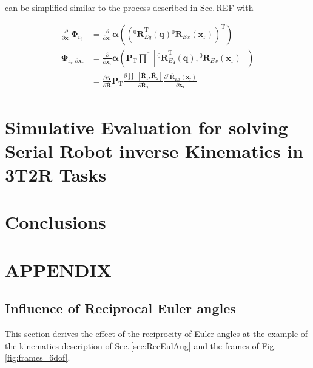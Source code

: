 \documentclass[twocolumn,10pt]{IFTOMM}
\newcommand{\bm}[1]{\boldsymbol{#1}}
\newcommand{\rotmat}[2]{{{ }^{#1}\boldsymbol{R}}_{#2}}
\newcommand{\rotmato}[2]{{{ }^{#1}\boldsymbol{\overline{R}}}_{#2}}
\newcommand{\transp}[0]{{\mathrm{T}}}
\begin{document}
can be simplified similar to the process described in Sec.\,REF with

\begin{align}
\frac{\partial}{\partial \bm{x}_{\mathrm{r}}}\bm{\Phi}_{\mathrm{r}_i}
&=
\frac{\partial}{\partial \bm{x}_{\mathrm{r}}} \bm{\alpha}\left((\rotmat{0}{Eq}^\transp(\bm{q}) \rotmat{0}{Ex}(\bm{x}_{\mathrm{r}}))^\transp\right) \label{equ:grad_Phi_x} \\
\bm{\Phi}_{\mathrm{r}_i,\partial \bm{x}_{\mathrm{r}}} 
&=
\frac{\partial}{\partial \bm{x}_{\mathrm{r}}} \overline{\bm{\alpha}}\left(
\bm{P}_{\mathrm{T}}
\overline{\prod}\left[ \rotmato{0}{Eq}^\transp(\bm{q}), \rotmato{0}{Ex}(\bm{x}_{\mathrm{r}})\right]\right) \nonumber \\
&=
\frac{\partial \overline{\bm{\alpha}}}{\partial \overline{\bm{R}}}
\bm{P}_{\mathrm{T}}
\frac{\partial \overline{\prod}\left[ \overline{\bm{R}}_1, \overline{\bm{R}}_2\right]}{\partial \overline{\bm{R}}_2}
\frac{\partial \rotmato{0}{Ex}(\bm{x}_{\mathrm{r}})}{\partial \bm{x}_{\mathrm{r}}} \nonumber
\end{align}





\section{Simulative Evaluation for solving Serial Robot inverse Kinematics in 3T2R Tasks}
\label{sec:SimEvalSerRobIK}

\section{Conclusions}
\label{sec:Conclusion}

\section{APPENDIX}

\subsection{Influence of Reciprocal Euler angles}
\label{sec:appendix_eulerreciproc}

This section derives the effect of the reciprocity of Euler-angles at the example of the kinematics description of Sec.\,\ref{sec:RecEulAng} and the frames of Fig.\,\ref{fig:frames_6dof}.
\end{document}
